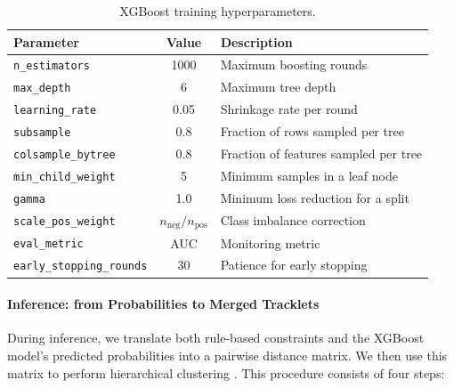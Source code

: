 \begin{table}[ht]
\centering

\begin{tabular}{l c l}
\hline
\textbf{Parameter} & \textbf{Value} & \textbf{Description} \\
\hline
\texttt{n\_estimators}        & 1000                          & Maximum boosting rounds \\
\texttt{max\_depth}           & 6                             & Maximum tree depth \\
\texttt{learning\_rate}       & 0.05                          & Shrinkage rate per round \\
\texttt{subsample}            & 0.8                           & Fraction of rows sampled per tree \\
\texttt{colsample\_bytree}    & 0.8                           & Fraction of features sampled per tree \\
\texttt{min\_child\_weight}   & 5                             & Minimum samples in a leaf node \\
\texttt{gamma}                & 1.0                           & Minimum loss reduction for a split \\
\texttt{scale\_pos\_weight}   & $n_{\text{neg}} / n_{\text{pos}}$ & Class imbalance correction \\
\texttt{eval\_metric}         & AUC                           & Monitoring metric \\
\texttt{early\_stopping\_rounds} & 30                         & Patience for early stopping \\
\hline
\end{tabular}
\caption{XGBoost training hyperparameters.}
\label{tab:xgb_hyperparams}
\end{table}


\paragraph{Inference: from Probabilities to Merged Tracklets}
During inference, we translate both rule-based constraints and the XGBoost model's predicted probabilities into a pairwise distance matrix. We then use this matrix to perform hierarchical clustering \cite{hierarchical_clustering}. This procedure consists of four steps:

